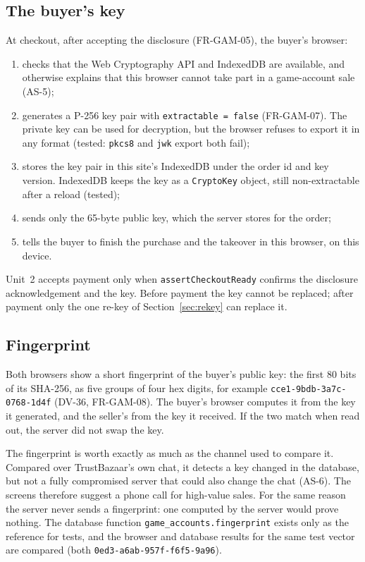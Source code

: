 \documentclass[11pt,a4paper]{article}
\begin{document}
\subsection{The buyer's key}
At checkout, after accepting the disclosure (FR-GAM-05), the buyer's browser:
\begin{enumerate}[nosep]
  \item checks that the Web Cryptography API and IndexedDB are available, and otherwise explains that this browser cannot take part in a game-account sale (AS-5);
  \item generates a P-256 key pair with \texttt{extractable = false} (FR-GAM-07). The private key can be used for decryption, but the browser refuses to export it in any format (tested: \texttt{pkcs8} and \texttt{jwk} export both fail);
  \item stores the key pair in this site's IndexedDB under the order id and key version. IndexedDB keeps the key as a \texttt{CryptoKey} object, still non-extractable after a reload (tested);
  \item sends only the 65-byte public key, which the server stores for the order;
  \item tells the buyer to finish the purchase and the takeover in this browser, on this device.
\end{enumerate}
Unit~2 accepts payment only when \texttt{assertCheckoutReady} confirms the disclosure acknowledgement and the key. Before payment the key cannot be replaced; after payment only the one re-key of Section~\ref{sec:rekey} can replace it.

\subsection{Fingerprint}
\label{sec:fingerprint}
Both browsers show a short fingerprint of the buyer's public key: the first 80 bits of its SHA-256, as five groups of four hex digits, for example \texttt{cce1-9bdb-3a7c-0768-1d4f} (DV-36, FR-GAM-08). The buyer's browser computes it from the key it generated, and the seller's from the key it received. If the two match when read out, the server did not swap the key.

The fingerprint is worth exactly as much as the channel used to compare it. Compared over TrustBazaar's own chat, it detects a key changed in the database, but not a fully compromised server that could also change the chat (AS-6). The screens therefore suggest a phone call for high-value sales. For the same reason the server never sends a fingerprint: one computed by the server would prove nothing. The database function \texttt{game\_accounts.fingerprint} exists only as the reference for tests, and the browser and database results for the same test vector are compared (both \texttt{0ed3-a6ab-957f-f6f5-9a96}).
\end{document}
